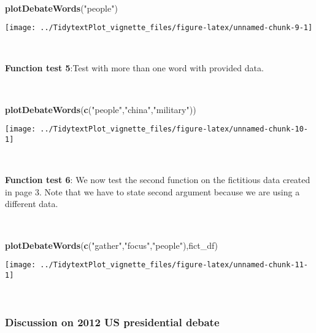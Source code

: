 \documentclass[
]{article}
\newenvironment{Shaded}{\begin{snugshade}}{\end{snugshade}}
\newcommand{\KeywordTok}[1]{\textcolor[rgb]{0.13,0.29,0.53}{\textbf{#1}}}
\newcommand{\NormalTok}[1]{#1}
\newcommand{\StringTok}[1]{\textcolor[rgb]{0.31,0.60,0.02}{#1}}
\begin{document}
~

\begin{Shaded}
\begin{Highlighting}[]
\KeywordTok{plotDebateWords}\NormalTok{(}\StringTok{"people"}\NormalTok{)}
\end{Highlighting}
\end{Shaded}

\begin{center}\texttt{[image: ../TidytextPlot\_vignette\_files/figure-latex/unnamed-chunk-9-1]} \end{center}

~

\textbf{Function test 5}:Test with more than one word with provided
data.

~

\begin{Shaded}
\begin{Highlighting}[]
\KeywordTok{plotDebateWords}\NormalTok{(}\KeywordTok{c}\NormalTok{(}\StringTok{"people"}\NormalTok{,}\StringTok{"china"}\NormalTok{,}\StringTok{"military"}\NormalTok{))}
\end{Highlighting}
\end{Shaded}

\begin{center}\texttt{[image: ../TidytextPlot\_vignette\_files/figure-latex/unnamed-chunk-10-1]} \end{center}

~

\textbf{Function test 6}: We now test the second function on the
fictitious data created in page 3. Note that we have to state second
argument because we are using a different data.

~

\begin{Shaded}
\begin{Highlighting}[]
\KeywordTok{plotDebateWords}\NormalTok{(}\KeywordTok{c}\NormalTok{(}\StringTok{"gather"}\NormalTok{,}\StringTok{"focus"}\NormalTok{,}\StringTok{"people"}\NormalTok{),fict_df)}
\end{Highlighting}
\end{Shaded}

\begin{center}\texttt{[image: ../TidytextPlot\_vignette\_files/figure-latex/unnamed-chunk-11-1]} \end{center}

~

\hypertarget{discussion-on-2012-us-presidential-debate}{%
\subsubsection{Discussion on 2012 US presidential
debate}\label{discussion-on-2012-us-presidential-debate}}
\end{document}
